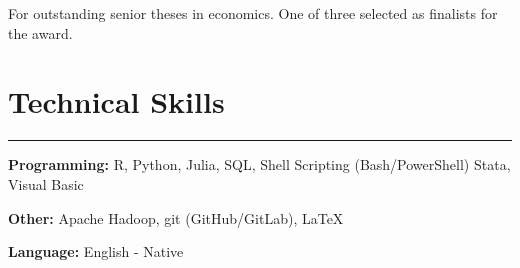 \documentclass[
  letterpaper,
  DIV=11,
  numbers=noendperiod]{scrartcl}
\let\oldrule=\rule
\renewcommand{\rule}[1]{\oldrule{\linewidth}}
\begin{document}
For outstanding senior theses in economics. One of three selected as
finalists for the award.

\hypertarget{technical-skills}{%
\section{Technical Skills}\label{technical-skills}}

\begin{center}\rule{0.5\linewidth}{0.5pt}\end{center}

\textbf{Programming:} R, Python, Julia, SQL, Shell Scripting
(Bash/PowerShell) Stata, Visual Basic

\textbf{Other:} Apache Hadoop, git (GitHub/GitLab), LaTeX

\textbf{Language:} English - Native
\end{document}
